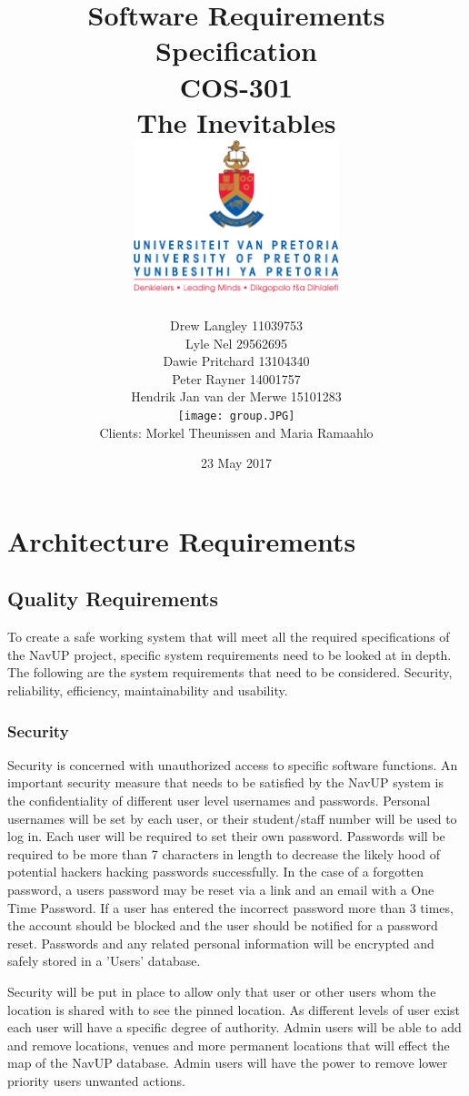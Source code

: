 \documentclass{article}
\title{ Software Requirements Specification \\ COS-301 \\ The Inevitables \\[0.5cm] \includegraphics[width=6cm]{front-page}}
\author{Drew Langley \hfill 11039753 \\ Lyle Nel \hfill 29562695 \\ Dawie Pritchard \hfill 13104340 \\  Peter Rayner \hfill 14001757\\ Hendrik Jan van der Merwe \hfill 15101283 \\ [1cm]\texttt{[image: group.JPG]}\\ [1cm] Clients: Morkel Theunissen and Maria Ramaahlo }
\date{23 May 2017}
\begin{document}
\maketitle
\pagebreak
\tableofcontents
\pagebreak


\newpage
	\section{Architecture Requirements}
		\subsection{Quality Requirements}
		 To create a safe working system that will meet all the required specifications of the NavUP project, specific system requirements need to be looked at in depth. The following are the system requirements that need to be considered. Security, reliability, efficiency, maintainability and usability.
		 
		 \subsubsection{Security}
		 Security is concerned with unauthorized access to specific software functions. An important security measure that needs to be satisfied by the NavUP system is the confidentiality of different user level usernames and passwords. Personal usernames will be set by each user, or their student/staff number will be used to log in. Each user will be required to set their own password. Passwords will be required to be more than 7 characters in length to decrease the likely hood of potential hackers hacking passwords successfully. In the case of a forgotten password, a users password may be reset via a link and an email with a One Time Password. If a user has entered the incorrect password more than 3 times, the account should be blocked and the user should be notified for a password reset. Passwords and any related personal information will be encrypted and safely stored in a 'Users' database.
		 
	Security will be put in place to allow only that user or other users whom the location is shared with to see the pinned location. As different levels of user exist each user will have a specific degree of authority. Admin users will be able to add and remove locations, venues and more permanent locations that will effect the map of the NavUP database. Admin users will have the power to remove lower priority users unwanted actions.
		 
\end{document}
